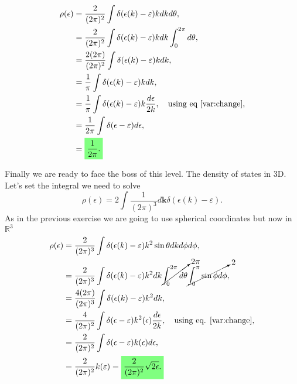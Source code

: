 \begin{questions}
\begin{solution}
\begin{equation}
  \begin{aligned}[b]
      \rho(\epsilon) &= \frac{2}{(2\pi)^2} \int  \delta(\epsilon(k) - \varepsilon)kdkd\theta,\\
       &= \frac{2}{(2\pi)^2} \int  \delta(\epsilon(k) - \varepsilon)kdk \int_0^{2\pi}d\theta,\\
       &= \frac{2(2\pi)}{(2\pi)^2} \int  \delta(\epsilon(k) - \varepsilon)kdk,\\
       &= \frac{1}{\pi} \int  \delta(\epsilon(k) - \varepsilon)kdk,\\
       &= \frac{1}{\pi} \int  \delta(\epsilon(k) - \varepsilon)k\frac{d\epsilon}{2k}, \quad \text{using eq \ref{var:change},}\\
       &= \frac{1}{2\pi} \int  \delta(\epsilon - \varepsilon)d\epsilon,\\
       &= \hlgreen{\frac{1}{2\pi}.}
  \end{aligned}
\end{equation}
\end{solution}
\begin{solution}
  Finally we are ready to face the boss of this level. The density of states in 3D. Let's set the integral we need to solve
  \begin{equation}
    \rho(\epsilon) = 2\int \frac{1}{(2\pi)^3}d\bm{k} \delta(\epsilon(k) - \varepsilon).
  \end{equation}
  As in the previous exercise we are going to use spherical coordinates but now in $\mathbb{R}^3$
  \begin{equation}
    \begin{aligned}[b]
      \rho(\epsilon) &= \frac{2}{(2\pi)^3}\int \delta(\epsilon(k) - \varepsilon)k^2\sin\theta dkd\phi d\phi,\\
      &=  \frac{2}{(2\pi)^3}\int \delta(\epsilon(k) - \varepsilon)k^2 dk\cancelto{2\pi}{\int_0^{2\pi} d\theta} \cancelto{2}{\int_{0}^\pi\sin\phi d\phi},\\
      &=  \frac{4(2\pi)}{(2\pi)^3}\int \delta(\epsilon(k) - \varepsilon)k^2 dk,\\
      &=  \frac{4}{(2\pi)^2}\int \delta(\epsilon - \varepsilon)k^2(\epsilon) \frac{d\epsilon}{2k}, \quad \text{using eq. \ref{var:change}},\\
      &=  \frac{2}{(2\pi)^2}\int \delta(\epsilon - \varepsilon)k(\epsilon) d\epsilon,\\
      &=  \frac{2}{(2\pi)^2} k(\varepsilon) = \hlgreen{\frac{2}{(2\pi)^2} \sqrt{2\epsilon}.}\\
    \end{aligned}
  \end{equation}
\end{solution}
\end{questions}
